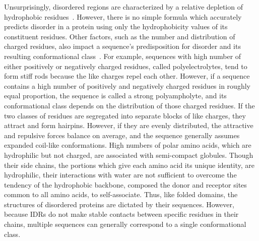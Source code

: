 Unsurprisingly, disordered regions are characterized by a relative depletion of hydrophobic resi\-dues~\cite{Uversky2000}. However, there is no simple formula which accurately predicts disorder in a protein using only the hydrophobicity values of its constituent residues. Other factors, such as the number and distribution of charged residues, also impact a sequence's predisposition for disorder and its resulting conformational class~\cite{Mao2010, vanderLee2014, Das2015}. For example, sequences with high number of either positively or negatively charged residues, called polyelectrolytes, tend to form stiff rods because the like charges repel each other. However, if a sequence contains a high number of positively and negatively charged residues in roughly equal proportion, the sequence is called a strong polyampholyte, and its conformational class depends on the distribution of those charged residues. If the two classes of residues are segregated into separate blocks of like charges, they attract and form hairpins. However, if they are evenly distributed, the attractive and repulsive forces balance on average, and the sequence generally assumes expanded coil-like conformations. High numbers of polar amino acids, which are hydrophilic but not charged, are associated with semi-compact globules. Though their side chains, the portions which give each amino acid its unique identity, are hydrophilic, their interactions with water are not sufficient to overcome the tendency of the hydrophobic backbone, composed the donor and receptor sites common to all amino acids, to self-associate. Thus, like folded domains, the structures of disordered proteins are dictated by their sequences. However, because IDRs do not make stable contacts between specific residues in their chains, multiple sequences can generally correspond to a single conformational class.

